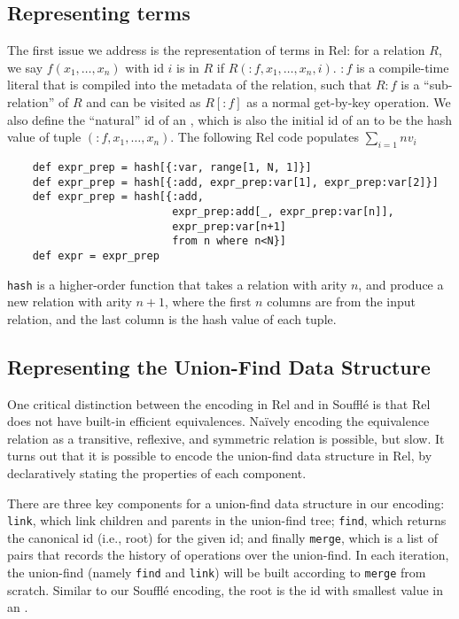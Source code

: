 \subsection{Representing terms}

The first issue we address is the representation of terms in Rel:
 for a relation $R$, 
 we say \enode $f(x_1,\ldots, x_n)$ with id $i$ is in $R$ 
 if $R(:f, x_1,\ldots,x_n, i)$.
$:f$ is a compile-time literal that is compiled into the metadata of the relation,
 such that $R:f$ is a ``sub-relation'' of $R$ and can be visited as $R[:f]$ 
 as a normal get-by-key operation.
We also define the ``natural'' \eclass id of an \enode, 
 which is also the initial \eclass id of 
 an \enode to be the hash value of tuple $(:f, x_1,\ldots, x_n)$.
The following Rel code populates $\sum_{i=1}{n}v_i$

\begin{verbatim}
    def expr_prep = hash[{:var, range[1, N, 1]}]
    def expr_prep = hash[{:add, expr_prep:var[1], expr_prep:var[2]}]
    def expr_prep = hash[{:add, 
                          expr_prep:add[_, expr_prep:var[n]], 
                          expr_prep:var[n+1] 
                          from n where n<N}]
    def expr = expr_prep
\end{verbatim}

\verb|hash| is a higher-order function that takes a relation with arity $n$, 
 and produce a new relation with arity $n+1$, 
 where the first $n$ columns are from the input relation, 
 and the last column is the hash value of each tuple.

\subsection{Representing the Union-Find Data Structure}

One critical distinction between the encoding in Rel and in Souffl\'e is 
 that Rel does not have built-in efficient equivalences.
Na\"ively encoding the equivalence relation as 
 a transitive, reflexive, and symmetric relation is possible, but slow.
It turns out that it is possible to encode the union-find data structure
 in Rel, by declaratively stating the properties of each component.

There are three key components for a union-find data structure in our encoding: 
\verb|link|, 
 which link children and parents in the union-find tree;
 \verb|find|, which returns the canonical id (i.e., root) for the given id;
 and finally \verb|merge|, which is a list of pairs 
 that records the history of operations over the union-find.
In each iteration, the union-find (namely \verb|find| and \verb|link|)
 will be built according to \verb|merge| from scratch.
Similar to our Souffl\'e encoding, 
 the root is the id with smallest value in an \eclass.

